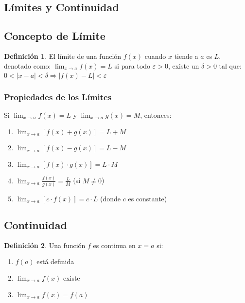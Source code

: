 \documentclass[12pt, a4paper, oneside]{book}
\theoremstyle{definition}
\newtheorem{definicion}{Definición}[chapter]
\begin{document}
\subsection{Límites y Continuidad}

\subsection{Concepto de Límite}

\begin{definicion}
El límite de una función $f(x)$ cuando $x$ tiende a $a$ es $L$, denotado como:
$\lim_{x \to a} f(x) = L$
si para todo $\varepsilon > 0$, existe un $\delta > 0$ tal que:
$0 < |x - a| < \delta \Rightarrow |f(x) - L| < \varepsilon$
\end{definicion}

\subsubsection{Propiedades de los Límites}

Si $\lim_{x \to a} f(x) = L$ y $\lim_{x \to a} g(x) = M$, entonces:

\begin{enumerate}
    \item $\lim_{x \to a} [f(x) + g(x)] = L + M$
    \item $\lim_{x \to a} [f(x) - g(x)] = L - M$
    \item $\lim_{x \to a} [f(x) \cdot g(x)] = L \cdot M$
    \item $\lim_{x \to a} \frac{f(x)}{g(x)} = \frac{L}{M}$ (si $M \neq 0$)
    \item $\lim_{x \to a} [c \cdot f(x)] = c \cdot L$ (donde $c$ es constante)
\end{enumerate}

\subsection{Continuidad}

\begin{definicion}
Una función $f$ es continua en $x = a$ si:
\begin{enumerate}
    \item $f(a)$ está definida
    \item $\lim_{x \to a} f(x)$ existe
    \item $\lim_{x \to a} f(x) = f(a)$
\end{enumerate}
\end{definicion}
\end{document}
